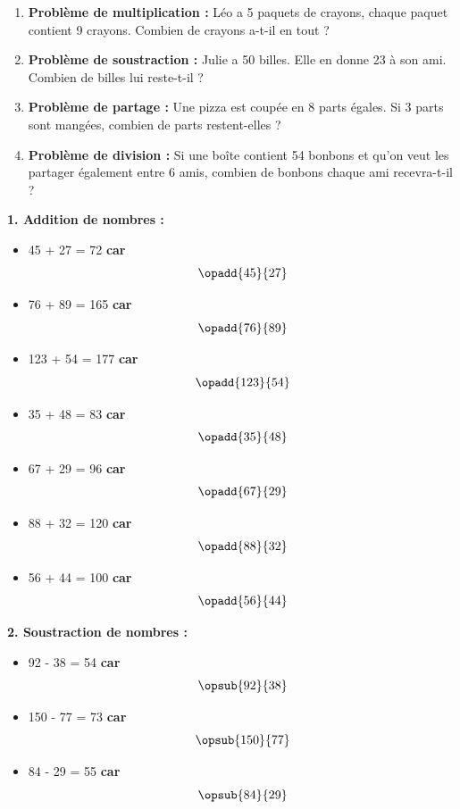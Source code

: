 \documentclass{article}
\begin{document}
\begin{tcolorbox}[colback=yellow!10!white, colframe=yellow!75!black, sharp corners=south, boxrule=0.8mm, title=Exercices]
\begin{enumerate}[label=\textbf{\arabic*.}]
        \item \textbf{Problème de multiplication :} Léo a 5 paquets de crayons, chaque paquet contient 9 crayons. Combien de crayons a-t-il en tout ?
        
        \item \textbf{Problème de soustraction :} Julie a 50 billes. Elle en donne 23 à son ami. Combien de billes lui reste-t-il ?

        \item \textbf{Problème de partage :} Une pizza est coupée en 8 parts égales. Si 3 parts sont mangées, combien de parts restent-elles ?

        \item \textbf{Problème de division :} Si une boîte contient 54 bonbons et qu’on veut les partager également entre 6 amis, combien de bonbons chaque ami recevra-t-il ?
    \end{enumerate}
\end{tcolorbox}

\begin{tcolorbox}[colback=green!10!white, colframe=green!75!black, sharp corners=south, boxrule=0.8mm, title=Corrections]
    \textbf{1. Addition de nombres :}
    \begin{itemize}
        \item 45 + 27 = 72 \textbf{car}
        \[
        \opadd{45}{27}
        \]
        \item 76 + 89 = 165 \textbf{car}
        \[
        \opadd{76}{89}
        \]
        \item 123 + 54 = 177 \textbf{car}
        \[
        \opadd{123}{54}
        \]
        \item 35 + 48 = 83 \textbf{car}
        \[
        \opadd{35}{48}
        \]
        \item 67 + 29 = 96 \textbf{car}
        \[
        \opadd{67}{29}
        \]
        \item 88 + 32 = 120 \textbf{car}
        \[
        \opadd{88}{32}
        \]
        \item 56 + 44 = 100 \textbf{car}
        \[
        \opadd{56}{44}
        \]
    \end{itemize}

    \textbf{2. Soustraction de nombres :}
    \begin{itemize}
        \item 92 - 38 = 54 \textbf{car}
        \[
        \opsub{92}{38}
        \]
        \item 150 - 77 = 73 \textbf{car}
        \[
        \opsub{150}{77}
        \]
        \item 84 - 29 = 55 \textbf{car}
        \[
        \opsub{84}{29}
        \]
    \end{itemize}
\end{tcolorbox}
\end{document}
